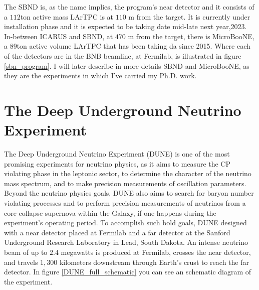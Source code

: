 The SBND is, as the name implies, the program's near detector and it consists of a $112$ton active mass LArTPC is at $110$ m from the target. It is currently under  installation phase and it is expected to be taking date mid-late next year,2023. In-between ICARUS and SBND, at $470$ m from the target, there is MicroBooNE, a $89$ton active volume LArTPC that has been taking da since 2015. Where each of the detectors are in the BNB beamline, at Fermilab, is illustrated in figure \ref{sbn_program}.
I will later describe in more details SBND and MicroBooNE, as they are the experiments in which I've carried my Ph.D. work. 

\section{The Deep Underground Neutrino Experiment}

The Deep Underground Neutrino Experiment (DUNE) is one of the most promising experiments for neutrino physics, as it aims to measure the CP violating phase in the leptonic sector, to determine the character of the neutrino mass spectrum, and to make precision measurements of oscillation parameters. Beyond the neutrino physics goals, DUNE also aims to search for baryon number violating processes and to perform precision measurements of neutrinos from a core-collapse supernova within the Galaxy, if one happens during the experiment's operating period. 
To accomplish such bold goals, DUNE designed with a near detector placed at Fermilab and a far detector at the Sanford Underground Research Laboratory in Lead, South Dakota. An intense neutrino beam of up to $2.4$ megawatts is produced at Fermilab, crosses the near detector, and travels $1,300$ kilometers downstream through Earth's crust to reach the far detector. In figure \ref{DUNE_full_schematic} you can see an schematic diagram of the experiment. 

